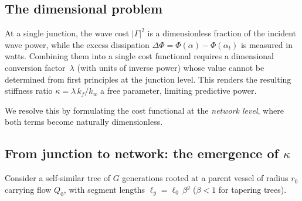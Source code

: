 \documentclass[11pt,a4paper]{article}
\theoremstyle{remark}
\begin{document}
\subsection{The dimensional problem}
\label{sec:dimensional}

At a single junction, the wave cost $|\Gamma|^2$ is a dimensionless fraction of
the incident wave power, while the excess dissipation $\Delta\Phi = \Phi(\alpha)
- \Phi(\alpha_t)$ is measured in watts.
Combining them into a single cost functional requires a dimensional conversion
factor~$\lambda$ (with units of inverse power) whose value cannot be determined
from first principles at the junction level.
This renders the resulting stiffness ratio $\kappa = \lambda\,k_f / k_w$ a free
parameter, limiting predictive power.

We resolve this by formulating the cost functional at the \emph{network level},
where both terms become naturally dimensionless.

\subsection{From junction to network: the emergence of $\kappa$}
\label{sec:network}

Consider a self-similar tree of $G$ generations rooted at a parent vessel of
radius $r_0$ carrying flow $Q_0$, with segment lengths $\ell_g =
\ell_0\,\beta^g$ ($\beta < 1$ for tapering trees).
\end{document}
